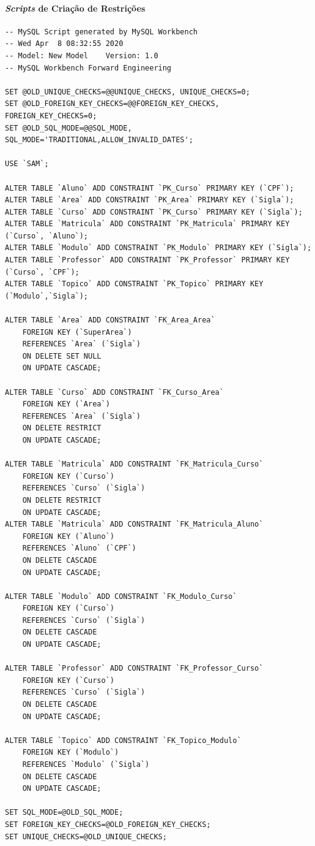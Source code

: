 \documentclass{article}
\begin{document}
\paragraph{\textit{Scripts} de Cria\c{c}\~ao de Restri\c{c}\~oes}

%
\begin{verbatim}
-- MySQL Script generated by MySQL Workbench
-- Wed Apr  8 08:32:55 2020
-- Model: New Model    Version: 1.0
-- MySQL Workbench Forward Engineering

SET @OLD_UNIQUE_CHECKS=@@UNIQUE_CHECKS, UNIQUE_CHECKS=0;
SET @OLD_FOREIGN_KEY_CHECKS=@@FOREIGN_KEY_CHECKS, FOREIGN_KEY_CHECKS=0;
SET @OLD_SQL_MODE=@@SQL_MODE, SQL_MODE='TRADITIONAL,ALLOW_INVALID_DATES';

USE `SAM`;

ALTER TABLE `Aluno` ADD CONSTRAINT `PK_Curso` PRIMARY KEY (`CPF`);
ALTER TABLE `Area` ADD CONSTRAINT `PK_Area` PRIMARY KEY (`Sigla`);
ALTER TABLE `Curso` ADD CONSTRAINT `PK_Curso` PRIMARY KEY (`Sigla`);
ALTER TABLE `Matricula` ADD CONSTRAINT `PK_Matricula` PRIMARY KEY (`Curso`, `Aluno`);
ALTER TABLE `Modulo` ADD CONSTRAINT `PK_Modulo` PRIMARY KEY (`Sigla`);
ALTER TABLE `Professor` ADD CONSTRAINT `PK_Professor` PRIMARY KEY (`Curso`, `CPF`);
ALTER TABLE `Topico` ADD CONSTRAINT `PK_Topico` PRIMARY KEY (`Modulo`,`Sigla`);

ALTER TABLE `Area` ADD CONSTRAINT `FK_Area_Area`
    FOREIGN KEY (`SuperArea`)
    REFERENCES `Area` (`Sigla`)
    ON DELETE SET NULL
    ON UPDATE CASCADE;

ALTER TABLE `Curso` ADD CONSTRAINT `FK_Curso_Area`
    FOREIGN KEY (`Area`)
    REFERENCES `Area` (`Sigla`)
    ON DELETE RESTRICT
    ON UPDATE CASCADE;

ALTER TABLE `Matricula` ADD CONSTRAINT `FK_Matricula_Curso`
    FOREIGN KEY (`Curso`)
    REFERENCES `Curso` (`Sigla`)
    ON DELETE RESTRICT
    ON UPDATE CASCADE;
ALTER TABLE `Matricula` ADD CONSTRAINT `FK_Matricula_Aluno`
    FOREIGN KEY (`Aluno`)
    REFERENCES `Aluno` (`CPF`)
    ON DELETE CASCADE
    ON UPDATE CASCADE;

ALTER TABLE `Modulo` ADD CONSTRAINT `FK_Modulo_Curso`
    FOREIGN KEY (`Curso`)
    REFERENCES `Curso` (`Sigla`)
    ON DELETE CASCADE
    ON UPDATE CASCADE;

ALTER TABLE `Professor` ADD CONSTRAINT `FK_Professor_Curso`
    FOREIGN KEY (`Curso`)
    REFERENCES `Curso` (`Sigla`)
    ON DELETE CASCADE
    ON UPDATE CASCADE;

ALTER TABLE `Topico` ADD CONSTRAINT `FK_Topico_Modulo`
    FOREIGN KEY (`Modulo`)
    REFERENCES `Modulo` (`Sigla`)
    ON DELETE CASCADE
    ON UPDATE CASCADE;

SET SQL_MODE=@OLD_SQL_MODE;
SET FOREIGN_KEY_CHECKS=@OLD_FOREIGN_KEY_CHECKS;
SET UNIQUE_CHECKS=@OLD_UNIQUE_CHECKS;

\end{verbatim}
\end{document}
